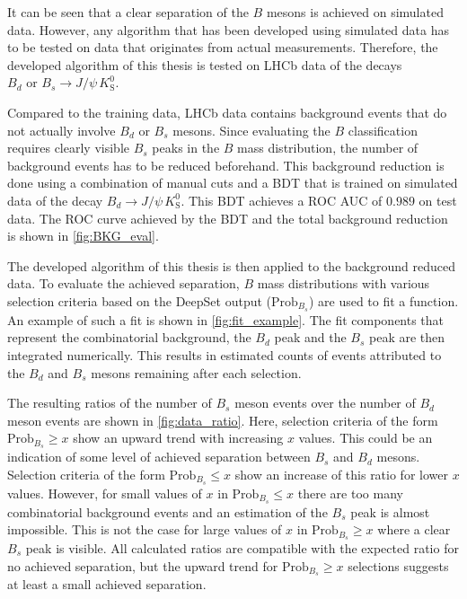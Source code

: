It can be seen that a clear separation of the $B$ mesons is achieved on simulated data.
However, any algorithm that has been developed using simulated data has to be tested on data that originates from actual measurements. 
Therefore, the developed algorithm of this thesis is tested on LHCb data of the decays $B_d \text{ or } B_s \rightarrow J/\psi \, K^0_\text{S}$.

Compared to the training data, LHCb data contains background events that do not actually involve $B_d$ or $B_s$ mesons.
Since evaluating the $B$ classification requires clearly visible $B_s$ peaks in the $B$ mass distribution, the number of background events has to be reduced beforehand.
This background reduction is done using a combination of manual cuts and a BDT that is trained on simulated data of the decay $B_d \rightarrow J/\psi \, K^0_\text{S}$.
This BDT achieves a ROC AUC of $0.989$ on test data.
The ROC curve achieved by the BDT and the total background reduction is shown in \autoref{fig:BKG_eval}.

The developed algorithm of this thesis is then applied to the background reduced data.
To evaluate the achieved separation, $B$ mass distributions with various selection criteria based on the DeepSet output ($\text{Prob}_{B_s}$) are used to fit a function.
An example of such a fit is shown in \autoref{fig:fit_example}. %
The fit components that represent the combinatorial background, the $B_d$ peak and the $B_s$ peak are then integrated numerically.
This results in estimated counts of events attributed to the $B_d$ and $B_s$ mesons remaining after each selection.

The resulting ratios of the number of $B_s$ meson events over the number of $B_d$ meson events are shown in \autoref{fig:data_ratio}.
Here, selection criteria of the form $\text{Prob}_{B_s} \geq x$ show an upward trend with increasing $x$ values.
This could be an indication of some level of achieved separation between $B_s$ and $B_d$ mesons.
Selection criteria of the form $\text{Prob}_{B_s} \leq x$ show an increase of this ratio for lower $x$ values.
However, for small values of $x$ in $\text{Prob}_{B_s} \leq x$ there are too many combinatorial background events and an estimation of the $B_s$ peak is almost impossible. 
This is not the case for large values of $x$ in $\text{Prob}_{B_s} \geq x$ where a clear $B_s$ peak is visible.
All calculated ratios are compatible with the expected ratio for no achieved separation, but the upward trend for $\text{Prob}_{B_s} \geq x$ selections suggests at least a small achieved separation.

